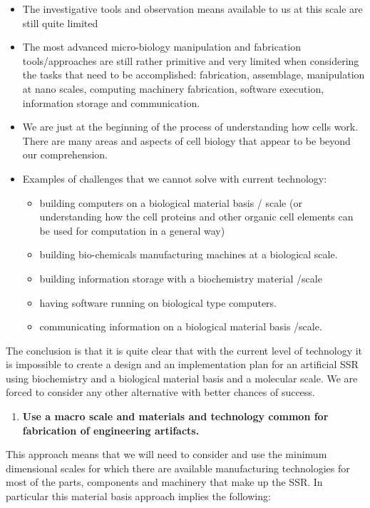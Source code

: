 \bigskip

\begin{itemize}
\item The investigative tools and observation means available to us at
this scale are still quite limited
\item The most advanced micro-biology manipulation and fabrication
tools/approaches are still rather primitive and very limited when
considering the tasks that need to be accomplished: fabrication,
assemblage, manipulation at nano scales, computing machinery
fabrication, software execution, information storage and communication.
\item We are just at the beginning of the process of understanding how
cells work. There are many areas and aspects of cell biology that
appear to be beyond our comprehension.
\item Examples of challenges that we cannot solve with current
technology: 

\begin{itemize}
\item building computers on a biological material basis / scale (or
understanding how the cell proteins and other organic cell elements can
be used for computation in a general way)
\item building bio-chemicals manufacturing machines at a biological
scale.
\item building information storage with a biochemistry material /scale
\item having software running on biological type computers.
\item communicating information on a biological material basis /scale.
\end{itemize}
\end{itemize}
The conclusion is that it is quite clear that with the current level of
technology it is impossible to create a design and an implementation
plan for an artificial SSR using biochemistry and a biological material
basis and a molecular scale. We are forced to consider any other
alternative with better chances of success.


\bigskip

\begin{enumerate}
\item \textbf{Use a macro scale and materials and technology common for
fabrication of engineering artifacts.}
\end{enumerate}
This approach means that we will need to consider and use the minimum
dimensional scales for which there are available manufacturing
technologies for most of the parts, components and machinery that make
up the SSR.  In particular this material basis approach implies the
following:


